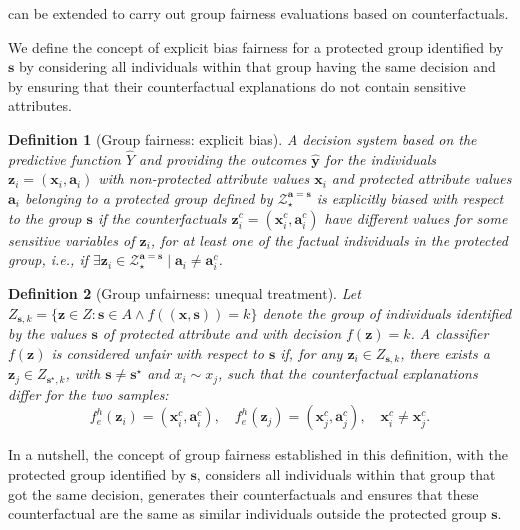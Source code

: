\documentclass[letterpaper]{article} %
\newtheorem{definition}{Definition}
\begin{document}
 can be extended to carry out group fairness evaluations based on counterfactuals.

We define the concept of explicit bias fairness for a protected group identified by $\boldsymbol{s}$ by considering all individuals within that group having the same decision and by ensuring that their counterfactual explanations do not contain sensitive attributes.

\begin{definition}[Group fairness: explicit bias]\label{explicit_bias_group}
	A decision system based on the predictive function $\hat{Y}$ and providing the outcomes $\boldsymbol{\hat{y}}$ for the individuals $\boldsymbol{z}_i = (\boldsymbol{x}_i, \boldsymbol{a}_i)$ with non-protected attribute values $\boldsymbol{x}_{i}$ and protected attribute values $\boldsymbol{a}_{i}$ belonging to a protected group defined by $\mathcal{Z}_\star^{\boldsymbol{a}=\boldsymbol{s}}$ is \emph{explicitly biased} with respect to the group $\boldsymbol{s}$ if the counterfactuals $\boldsymbol{z}_i^c = (\boldsymbol{x}_i^c, \boldsymbol{a}_i^c)$ have different values for some sensitive variables of $\boldsymbol{z}_i$, for at least one of the factual individuals in the protected group, i.e., if $\exists \boldsymbol{z}_i \in \mathcal{Z}_\star^{\boldsymbol{a}=\boldsymbol{s}} \mid \boldsymbol{a}_i \neq \boldsymbol{a}_{i}^{c}$.
\end{definition}

\begin{definition}[Group unfairness: unequal treatment]\label{unequal_treatment_group}
	Let $Z_{\boldsymbol{s}, k} = \{ \boldsymbol{z} \in Z : \boldsymbol{s} \in A \wedge f((\boldsymbol{x}, \boldsymbol{s})) = k \}$ denote the group of individuals identified by the values $\boldsymbol{s}$ of protected attribute and with decision $f(\boldsymbol{z})=k$.
	A classifier $f(\boldsymbol{z})$ is considered unfair with respect to $\boldsymbol{s}$  if, for any $\boldsymbol{z}_i \in Z_{\boldsymbol{s}, k}$, there exists a $\boldsymbol{z}_j \in Z_{\boldsymbol{s}^\star,k}$, with $\boldsymbol{s} \neq \boldsymbol{s}^\star$ and $x_i \sim x_j$, such that the counterfactual explanations differ for the two samples: 
	$$ f_{e}^{h}(\boldsymbol{z}_{i}) = (\boldsymbol{x}_{i}^c, \boldsymbol{a}_{i}^c), \quad f_{e}^{h}(\boldsymbol{z}_{j}) = (\boldsymbol{x}_{j}^{c}, \boldsymbol{a}_{j}^{c}), \quad \boldsymbol{x}_{i}^c \neq \boldsymbol{x}_{j}^{c}.$$ 
\end{definition}
%
\noindent In a nutshell, the concept of group fairness established in this definition, with the protected group identified by $\boldsymbol{s}$, considers all individuals within that group that got the same decision, generates their counterfactuals and ensures that these counterfactual are the same as similar individuals outside the protected group $\boldsymbol{s}$.
\end{document}
